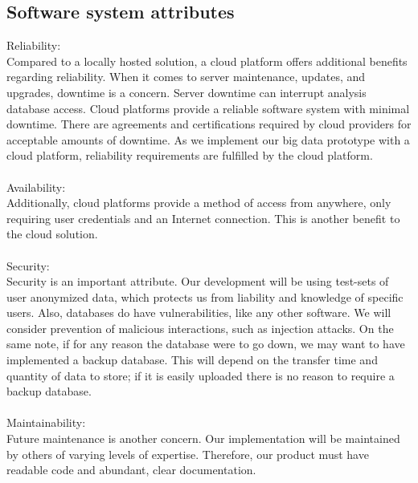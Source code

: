\documentclass[10pt,draftclsnofoot,onecolumn,journal,compsoc]{IEEEtran}
\begin{document}
        \subsection{Software system attributes}
        Reliability:\\
        Compared to a locally hosted solution, a cloud platform offers additional benefits regarding reliability. When it comes to server maintenance, updates, and upgrades, downtime is a concern. Server downtime can interrupt analysis database access. Cloud platforms provide a reliable software system with minimal downtime\cite{AWS Rate}. There are agreements and certifications required by cloud providers\cite{Cloud} for acceptable amounts of downtime. As we implement our big data prototype with a cloud platform, reliability requirements are fulfilled by the cloud platform.\\
        \\
        Availability:\\
        Additionally, cloud platforms provide a method of access from anywhere, only requiring user credentials and an Internet connection. This is another benefit to the cloud solution.\\
        \\
        Security:\\
        Security is an important attribute. Our development will be using test-sets of user anonymized data, which protects us from liability and knowledge of specific users. Also, databases do have vulnerabilities, like any other software. We will consider prevention of malicious interactions, such as injection attacks. On the same note, if for any reason the database were to go down, we may want to have implemented a backup database. This will depend on the transfer time and quantity of data to store; if it is easily uploaded there is no reason to require a backup database.\\
        \\
        Maintainability:\\
        Future maintenance is another concern. Our implementation will be maintained by others of varying levels of expertise. Therefore, our product must have readable code and abundant, clear documentation.
    
    \newpage
\end{document}
